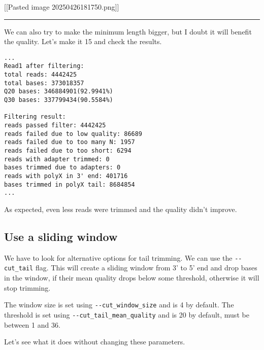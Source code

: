 {[}{[}Pasted image 20250426181750.png{]}{]}

\begin{center}\rule{0.5\linewidth}{0.5pt}\end{center}

We can also try to make the minimum length bigger, but I doubt it will
benefit the quality. Let's make it 15 and check the results.

\begin{verbatim}
...
Read1 after filtering:
total reads: 4442425
total bases: 373018357
Q20 bases: 346884901(92.9941%)
Q30 bases: 337799434(90.5584%)

Filtering result:
reads passed filter: 4442425
reads failed due to low quality: 86689
reads failed due to too many N: 1957
reads failed due to too short: 6294
reads with adapter trimmed: 0
bases trimmed due to adapters: 0
reads with polyX in 3' end: 401716
bases trimmed in polyX tail: 8684854
...
\end{verbatim}

As expected, even less reads were trimmed and the quality didn't
improve.

\hypertarget{use-a-sliding-window}{%
\subsection{Use a sliding window}\label{use-a-sliding-window}}

We have to look for alternative options for tail trimming. We can use
the \texttt{-\/-cut\_tail} flag. This will create a sliding window from
3' to 5' end and drop bases in the window, if their mean quality drops
below some threshold, otherwise it will stop trimming.

The window size is set using \texttt{-\/-cut\_window\_size} and is 4 by
default. The threshold is set using
\texttt{-\/-cut\_tail\_mean\_quality} and is 20 by default, must be
between 1 and 36.

Let's see what it does without changing these parameters.

\begin{Shaded}
\begin{Highlighting}[]
\end{Highlighting}
\end{Shaded}

